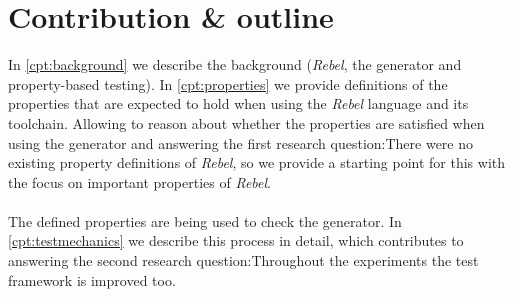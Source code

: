 \section{Contribution \& outline}
In \autoref{cpt:background} we describe the background (\textit{Rebel}, the
generator and property-based testing).
In \autoref{cpt:properties} we provide definitions of the properties that are
expected to hold when using the \textit{Rebel} language and its toolchain.
Allowing to reason about whether the properties are satisfied when using the
generator and answering the first research question:\rqOne There were
no existing property definitions of \textit{Rebel}, so we provide a starting
point for this with the focus on important properties of \textit{Rebel}.\\
\\
The defined properties are being used to check the generator. In
\autoref{cpt:testmechanics} we describe this process in detail, which
contributes to answering the second research question:\rqTwo Throughout the experiments the test framework is improved too.\\
\\
